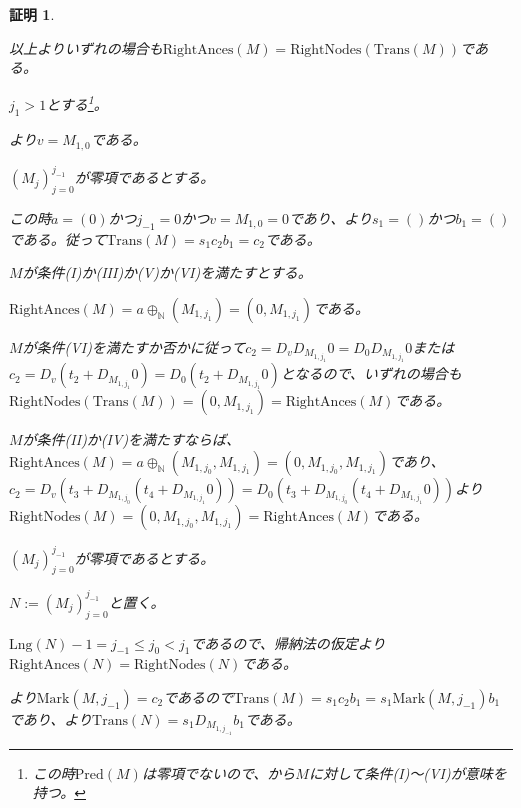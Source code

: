 \documentclass[dvipdfmx,uplatex]{jsarticle}
\theoremstyle{customnonumberbreakfortheorem}
\theoremstyle{customnonumberbreakforproof}
\newtheorem{hideableproof}{証明}
\begin{document}
\begin{hideableproof}
\begin{indented}
\begin{indented}
\begin{indented}
			\end{indented}
			\item 以上よりいずれの場合も\(\textrm{RightAnces}(M) = \textrm{RightNodes}(\textrm{Trans}(M))\)である。
		\end{indented}
		\item \(j_1 > 1\)とする\footnote{この時\(\textrm{Pred}(M)\)は零項でないので、から\(M\)に対して条件(I)～(VI)が意味を持つ。}。
		\begin{indented}
			\item {}より\(v = M_{1,0}\)である。
			\item \((M_j)_{j=0}^{j_{-1}}\)が零項であるとする。
			\begin{indented}
				\item この時\(a = (0)\)かつ\(j_{-1} = 0\)かつ\(v = M_{1,0} = 0\)であり、より\(s_1 = ()\)かつ\(b_1 = ()\)である。従って\(\textrm{Trans}(M) = s_1 c_2 b_1 = c_2\)である。
				\item \(M\)が条件(I)か(III)か(V)か(VI)を満たすとする。
				\begin{indented}
					\item \(\textrm{RightAnces}(M) = a \oplus_{\mathbb{N}} (M_{1,j_1}) = (0,M_{1,j_1})\)である。
					\item \(M\)が条件(VI)を満たすか否かに従って\(c_2 = D_v D_{M_{1,j_1}} 0 = D_0 D_{M_{1,j_1}} 0\)または\(c_2 = D_v(t_2 + D_{M_{1,j_1}} 0) = D_0(t_2 + D_{M_{1,j_1}} 0)\)となるので、いずれの場合も\(\textrm{RightNodes}(\textrm{Trans}(M)) = (0,M_{1,j_1}) = \textrm{RightAnces}(M)\)である。
				\end{indented}
				\item \(M\)が条件(II)か(IV)を満たすならば、\(\textrm{RightAnces}(M) = a \oplus_{\mathbb{N}} (M_{1,j_0},M_{1,j_1}) = (0,M_{1,j_0},M_{1,j_1})\)であり、\(c_2 = D_v(t_3 + D_{M_{1,j_0}}(t_4 + D_{M_{1,j_1}} 0)) = D_0(t_3 + D_{M_{1,j_0}}(t_4 + D_{M_{1,j_1}} 0))\)より\(\textrm{RightNodes}(M) = (0,M_{1,j_0},M_{1,j_1}) = \textrm{RightAnces}(M)\)である。
			\end{indented}
			\item \((M_j)_{j=0}^{j_{-1}}\)が零項であるとする。
			\begin{indented}
				\item \(N := (M_j)_{j=0}^{j_{-1}}\)と置く。
				\item \(\textrm{Lng}(N)-1 = j_{-1} \leq j_0 < j_1\)であるので、帰納法の仮定より\(\textrm{RightAnces}(N) = \textrm{RightNodes}(N)\)である。
				\item {}より\(\textrm{Mark}(M,j_{-1}) = c_2\)であるので\(\textrm{Trans}(M) = s_1 c_2 b_1 = s_1 \textrm{Mark}(M,j_{-1}) b_1\)であり、より\(\textrm{Trans}(N) = s_1 D_{M_{1,j_{-1}}} b_1\)である。

\end{indented}
\end{indented}
\end{indented}
\end{hideableproof}
\end{document}
